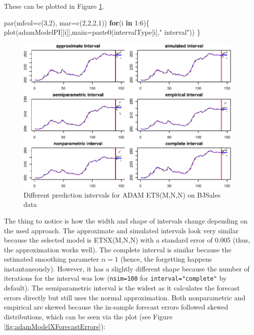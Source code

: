 \documentclass[
]{book}
\newenvironment{Shaded}{\begin{snugshade}}{\end{snugshade}}
\newcommand{\AttributeTok}[1]{\textcolor[rgb]{0.77,0.63,0.00}{#1}}
\newcommand{\ControlFlowTok}[1]{\textcolor[rgb]{0.13,0.29,0.53}{\textbf{#1}}}
\newcommand{\DecValTok}[1]{\textcolor[rgb]{0.00,0.00,0.81}{#1}}
\newcommand{\FunctionTok}[1]{\textcolor[rgb]{0.00,0.00,0.00}{#1}}
\newcommand{\NormalTok}[1]{#1}
\newcommand{\SpecialCharTok}[1]{\textcolor[rgb]{0.00,0.00,0.00}{#1}}
\newcommand{\StringTok}[1]{\textcolor[rgb]{0.31,0.60,0.02}{#1}}
\theoremstyle{definition}
\theoremstyle{definition}
\theoremstyle{definition}
\theoremstyle{definition}
\theoremstyle{remark}
\begin{document}
These can be plotted in Figure \ref{fig:adamModelXPI6Plots}.

\begin{Shaded}
\begin{Highlighting}[]
\FunctionTok{par}\NormalTok{(}\AttributeTok{mfcol=}\FunctionTok{c}\NormalTok{(}\DecValTok{3}\NormalTok{,}\DecValTok{2}\NormalTok{), }\AttributeTok{mar=}\FunctionTok{c}\NormalTok{(}\DecValTok{2}\NormalTok{,}\DecValTok{2}\NormalTok{,}\DecValTok{2}\NormalTok{,}\DecValTok{1}\NormalTok{))}
\ControlFlowTok{for}\NormalTok{(i }\ControlFlowTok{in} \DecValTok{1}\SpecialCharTok{:}\DecValTok{6}\NormalTok{)\{}
  \FunctionTok{plot}\NormalTok{(adamModelPI[[i]],}\AttributeTok{main=}\FunctionTok{paste0}\NormalTok{(intervalType[i],}\StringTok{" interval"}\NormalTok{))}
\NormalTok{\}}
\end{Highlighting}
\end{Shaded}

\begin{figure}
\centering
\includegraphics{Svetunkov--2022----ADAM_files/figure-latex/adamModelXPI6Plots-1.pdf}
\caption{\label{fig:adamModelXPI6Plots}Different prediction intervals for ADAM ETS(M,N,N) on BJSales data}
\end{figure}

The thing to notice is how the width and shape of intervals change depending on the used approach. The approximate and simulated intervals look very similar because the selected model is ETSX(M,N,N) with a standard error of 0.005 (thus, the approximation works well). The complete interval is similar because the estimated smoothing parameter \(\alpha=1\) (hence, the forgetting happens instantaneously). However, it has a slightly different shape because the number of iterations for the interval was low (\texttt{nsim=100} for \texttt{interval="complete"} by default). The semiparametric interval is the widest as it calculates the forecast errors directly but still uses the normal approximation. Both nonparametric and empirical are skewed because the in-sample forecast errors followed skewed distributions, which can be seen via the plot (see Figure \ref{fig:adamModelXForecastErrors}):
\end{document}
